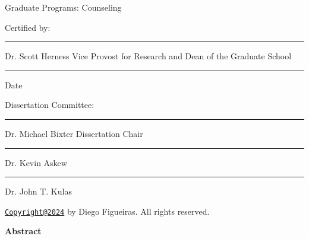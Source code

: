 \documentclass[
  man]{apa7}
\begin{document}
\begin{multicols}{2}  

Graduate Programs:
\newline
Counseling

\vskip 0.6in

Certified by:

\vskip 0.6in  

\linespread{1.0}\selectfont
\rule{6cm}{0.2mm}
\newline
Dr. Scott Herness
\newline
Vice Provost for Research and
\newline
Dean of the Graduate School

\vskip 0.3in

\rule{6cm}{0.2mm}
\newline
Date

\columnbreak

Dissertation Committee:

\vskip 0.6in

\rule{6cm}{0.2mm}
\newline
Dr. Michael Bixter
\newline
Dissertation Chair

\vskip 0.6in

\rule{6cm}{0.2mm}
\newline
Dr. Kevin Askew

\vskip 0.6in

\rule{6cm}{0.2mm}
\newline
Dr. John T. Kulas


\end{multicols}

\newpage
{}
\renewcommand{\headrulewidth}{0pt}
\renewcommand{\footrulewidth}{0pt}

\begin{center}

\phantom{i'm a ghost}

\vskip 1.6in

\href{mailto:Copyright@2024}{\nolinkurl{Copyright@2024}} by Diego Figueiras. All rights reserved.

\end{center}

\newpage
{}
\renewcommand{\headrulewidth}{0pt}
\renewcommand{\footrulewidth}{0pt}

\begin{center}

\textbf{Abstract}

\end{center}
\end{document}
